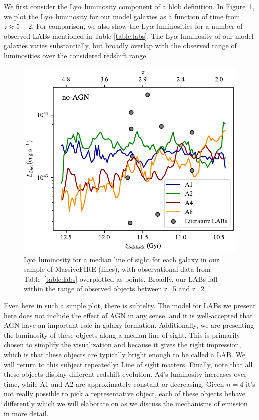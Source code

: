 We first consider the Ly$\alpha$ luminosity component of a blob definition.
In Figure~\ref{fig:luminosity_redshift}, we plot the Ly$\alpha$ luminosity for our model galaxies as a function of time from $z\approx5-2$.
For comparison, we also show the Ly$\alpha$ luminosities for a number of observed LABs mentioned in Table \ref{table:labs}.
The Ly$\alpha$ luminosity of our model galaxies varies substantially, but broadly overlap  with the observed range of luminosities over the considered redshift range.

\begin{figure}
    \centering
    \includegraphics[width=\textwidth,height=\textheight,keepaspectratio]{figures/luminosity_redshift.pdf}
    \caption{
        Ly$\alpha$ luminosity for a median line of sight for each galaxy in our sample of MassiveFIRE (lines), with observational data from Table~\ref{table:labs} overplotted as points.
        Broadly, our LABs fall within the range of observed objects between z=5 and z=2.
    }
    \label{fig:luminosity_redshift}
\end{figure}

Even here in such a simple plot, there is subtelty.
The model for LABs we present here does not include the effect of AGN in any sense, and it is well-accepted that AGN have an important role in galaxy formation.
Additionally, we are presenting the luminosity of these objects along a median line of sight.
This is primarily chosen to simplify the visualization and because it gives the right impression, which is that these objects are typically bright enough to be called a LAB.
We will return to this subject repeatedly: Line of sight matters.
Finally, note that all these objects display different redshift evolution.
A4's luminosity increases over time, while A1 and A2 are approximately constant or decreasing.
Given $n=4$ it's not really possible to pick a representative object, each of these objects behave differently which we will elaborate on as we discuss the mechanisms of emission in more detail.

